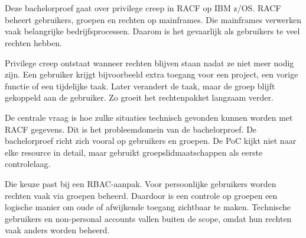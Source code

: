 



\chapter*{}

Deze bachelorproef gaat over privilege creep in RACF op IBM z/OS. RACF beheert gebruikers, groepen en rechten op mainframes. Die mainframes verwerken vaak belangrijke bedrijfsprocessen. Daarom is het gevaarlijk als gebruikers te veel rechten hebben.

Privilege creep ontstaat wanneer rechten blijven staan nadat ze niet meer nodig zijn. Een gebruiker krijgt bijvoorbeeld extra toegang voor een project, een vorige functie of een tijdelijke taak. Later verandert de taak, maar de groep blijft gekoppeld aan de gebruiker. Zo groeit het rechtenpakket langzaam verder.

De centrale vraag is hoe zulke situaties technisch gevonden kunnen worden met RACF gegevens. Dit is het probleemdomein van de bachelorproef. De bachelorproef richt zich vooral op gebruikers en groepen. De PoC kijkt niet naar elke resource in detail, maar gebruikt groepslidmaatschappen als eerste controlelaag.

Die keuze past bij een RBAC-aanpak. Voor persoonlijke gebruikers worden rechten vaak via groepen beheerd. Daardoor is een controle op groepen een logische manier om oude of afwijkende toegang zichtbaar te maken. Technische gebruikers en non-personal accounts vallen buiten de scope, omdat hun rechten vaak anders worden beheerd.


